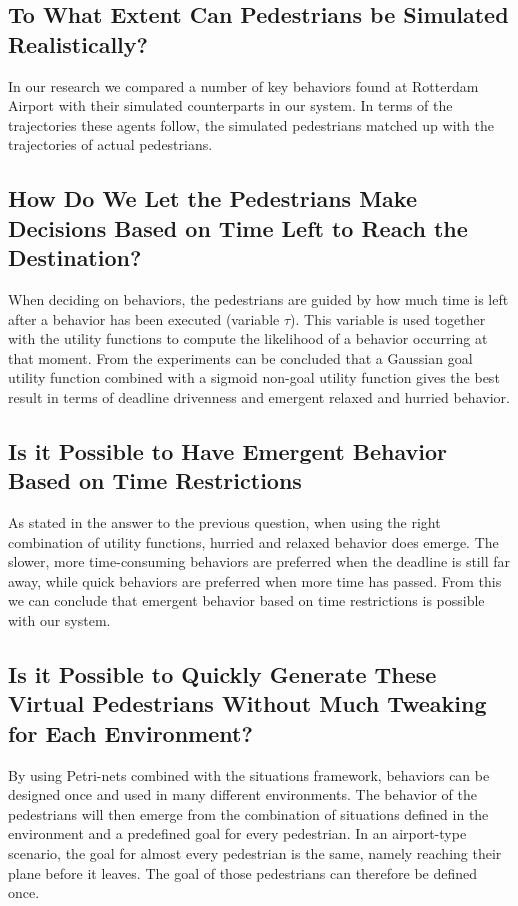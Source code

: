 \documentclass[11pt, a4paper]{book}
\begin{document}
\subsection{To What Extent Can Pedestrians be Simulated Realistically?}
In our research we compared a number of key behaviors found at Rotterdam Airport with their simulated counterparts in our system. In terms of the trajectories these agents follow, the simulated pedestrians matched up with the trajectories of actual pedestrians. 

\subsection{How Do We Let the Pedestrians Make Decisions Based on Time Left to Reach the Destination?}
When deciding on behaviors, the pedestrians are guided by how much time is left after a behavior has been executed (variable $\tau$). This variable is used together with the utility functions to compute the likelihood of a behavior occurring at that moment. From the experiments can be concluded that a Gaussian goal utility function combined with a sigmoid non-goal utility function gives the best result in terms of deadline drivenness and emergent relaxed and hurried behavior.

\subsection{Is it Possible to Have Emergent Behavior Based on Time Restrictions}
As stated in the answer to the previous question, when using the right combination of utility functions, hurried and relaxed behavior does emerge. The slower, more time-consuming behaviors are preferred when the deadline is still far away, while quick behaviors are preferred when more time has passed. From this we can conclude that emergent behavior based on time restrictions is possible with our system.

\subsection{Is it Possible to Quickly Generate These Virtual Pedestrians Without Much Tweaking for Each Environment?}
By using Petri-nets combined with the situations framework, behaviors can be designed once and used in many different environments. The behavior of the pedestrians will then emerge from the combination of situations defined in the environment and a predefined goal for every pedestrian. In an airport-type scenario, the goal for almost every pedestrian is the same, namely reaching their plane before it leaves. The goal of those pedestrians can therefore be defined once.
\end{document}

